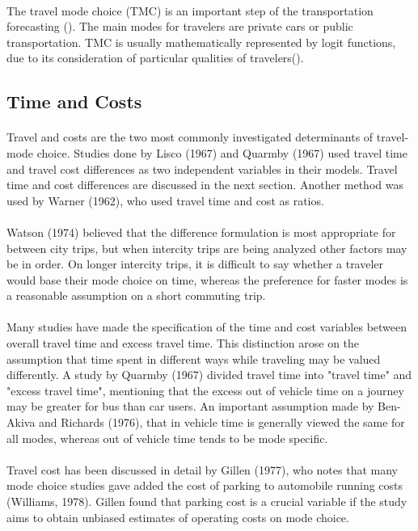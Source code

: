 \paragraph{}The travel mode choice (TMC) is an important step of the transportation forecasting (\cite{Litman,2011}). The main modes for travelers are private cars or public transportation. TMC is usually mathematically represented by logit functions, due to its consideration of particular qualities of travelers(\cite{Bravo et al, 2009}).
\subsection{Time and Costs}
\paragraph{}Travel and costs are the two most commonly investigated determinants of travel-mode choice. Studies done by Lisco (1967) and Quarmby (1967) used travel time and travel cost differences as two independent variables in their models. Travel time and cost differences are discussed in the next section. Another method was used by Warner (1962), who used travel time and cost as ratios.
\paragraph{}Watson (1974) believed that the difference formulation is most appropriate for between city trips, but when intercity trips are being analyzed other factors may be in order. On longer intercity trips, it is difficult to say whether a traveler would base their mode choice on time, whereas the preference for faster modes is a reasonable assumption on a short commuting trip. 
\paragraph{}Many studies have made the specification of the time and cost variables between overall travel time and excess travel time. This distinction arose on the assumption that time spent in different ways while traveling may be valued differently. A study by Quarmby (1967) divided travel time into "travel time" and "excess travel time", mentioning that the excess out of vehicle time on a journey may be greater for bus than car users. An important assumption made by Ben-Akiva and Richards (1976), that in vehicle time is generally viewed the same for all modes, whereas out of vehicle time tends to be mode  specific. 
\paragraph{}Travel cost has been discussed in detail by Gillen (1977), who notes that many mode choice studies gave added the cost of parking to automobile running costs (Williams, 1978). Gillen found that parking cost is a  crucial variable if the study aims to obtain unbiased estimates of operating costs on mode choice. 
